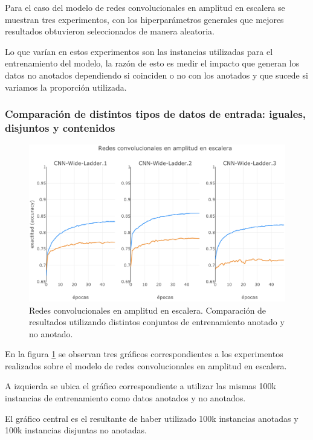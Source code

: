 Para el caso del modelo de redes convolucionales en amplitud en escalera se muestran tres experimentos, con 
los hiperparámetros generales que mejores resultados obtuvieron seleccionados de manera aleatoria. 

Lo que varían en estos experimentos son las instancias utilizadas para el entrenamiento del modelo, la razón 
de esto es medir el impacto que generan los datos no anotados dependiendo si coinciden o no con los anotados y
que sucede si variamos la proporción utilizada.

\subsubsection{Comparación de distintos tipos de datos de entrada: iguales, disjuntos y contenidos}

\begin{figure}[t]
\begin{center}
\includegraphics[width=.9\linewidth]{images/CNN_wide_ladder.png}
\caption{Redes convolucionales en amplitud en escalera. Comparación de resultados utilizando distintos
conjuntos de entrenamiento anotado y no anotado.}
\label{fig:CNN_wide_ladder}
\end{center}
\end{figure}

En la figura \ref{fig:CNN_wide_ladder} se observan tres gráficos correspondientes a los experimentos 
realizados sobre el modelo de redes convolucionales en amplitud en escalera. 

A izquierda se ubica el gráfico correspondiente a utilizar las mismas 100k instancias de entrenamiento como 
datos anotados y no anotados. 

El gráfico central es el resultante de haber utilizado 100k instancias anotadas y 100k instancias disjuntas no anotadas. 

